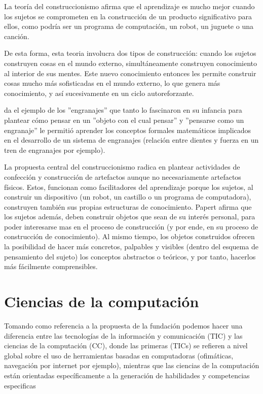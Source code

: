 La  teoría  del  construccionismo  afirma  que  el  aprendizaje  es  mucho  mejor  cuando  los  sujetos  se
comprometen en la construcción de un producto significativo para ellos, como podría ser un programa de computación, un robot, un juguete o una canción.

De esta forma, esta teoria involucra dos tipos de construcción: cuando los sujetos construyen
cosas en el mundo externo, simultáneamente construyen conocimiento al interior de sus mentes.  Este
nuevo  conocimiento  entonces  les  permite  construir  cosas  mucho  más  sofisticadas  en  el  mundo
externo, lo que genera más conocimiento, y así sucesivamente en un ciclo autoreforzante.

\cite{seymour_papert_desafio_1987}  da el ejemplo de los ''engranajes'' que tanto lo fascinaron en su infancia para plantear cómo pensar en un ''objeto con el cual pensar'' y ''pensarse como un engranaje'' le permitió aprender los conceptos formales matemáticos implicados en el desarrollo de un sistema de engranajes (relación entre dientes y fuerza en un tren de engranajes por ejemplo).

La propuesta central del construccionismo radica en plantear actividades de confección y construcción de artefactos aunque no necesariamente artefactos físicos. Estos, funcionan como facilitadores del aprendizaje porque los sujetos, al construir un dispositivo (un robot, un castillo o un programa de computadora), construyen también sus propias estructuras de conocimiento. Papert afirma que los sujetos además, deben construir objetos que sean de su interés personal, para poder interesarse mas en el proceso de construcción (y por ende, en su proceso de construcción de conocimiento). Al mismo tiempo, los objetos construidos ofrecen la posibilidad de hacer más concretos, palpables y visibles (dentro del esquema de pensamiento del sujeto) los conceptos abstractos o teóricos, y por tanto, hacerlos más fácilmente comprensibles.



\section{Ciencias de la computación}

Tomando como referencia a la propuesta de la fundación \cite{sadosky2013cc} podemos hacer una diferencia entre las  tecnologías de la  información y comunicación (TIC) y las ciencias de la computación (CC), donde las primeras (TICs) se refieren a nivel global sobre el uso de herramientas basadas en computadoras (ofimáticas, navegación por internet por ejemplo), mientras que las ciencias de la computación están orientadas específicamente a la generación de habilidades y competencias especificas 

